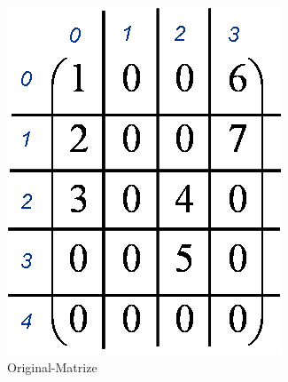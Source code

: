 \begin{figure}[htbp]
	\begin{center}
		\begin{minipage}[t]{0.4\linewidth}
			\centering
			\includegraphics[width=\linewidth]{.//pic//orignal_sparse}
			\caption{Original-Matrize}
			\label{orignal_sparse}
		\end{minipage}
		\qquad
		\begin{minipage}[t]{0.4\linewidth}
			\centering

\end{minipage}
\end{center}
\end{figure}
